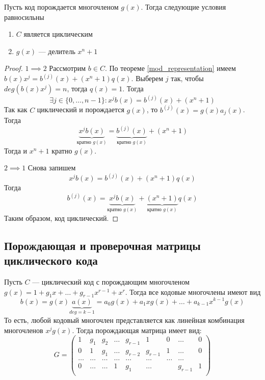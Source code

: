 \begin{theorem}
Пусть код порождается многочленом $g(x)$. Тогда следующие условия равносильны
\begin{enumerate}
\item $C$ является циклическим
\item $g(x)$ --- делитель $x^n + 1$
\end{enumerate}
\end{theorem}

\begin{proof}
$1 \implies 2$ Рассмотрим $b \in C$. По теореме \ref{mod_representation} имеем
$b(x) x^j = b^{(j)}(x) + (x^n + 1) q(x)$. Выберем $j$ так, чтобы $deg(b(x) x^j) = n$,
тогда $q(x) = 1$. Тогда 
$$\exists j \in \{0, \ldots, n-1\} \colon x^j b(x) = b^{(j)}(x) + (x^n + 1)$$
Так как $C$ циклический и порождается $g(x)$, то $b^{(j)}(x) = g(x) a_j(x)$.
Тогда 
$$\underbrace{x^j b(x)}_{\text{кратно }g(x)} = 
\underbrace{b^{(j)}(x)}_{\text{кратно } g(x)} + (x^n + 1)$$
Тогда и $x^n + 1$ кратно $g(x)$.

$2 \implies 1$ Снова запишем
$$x^j b(x) = b^{(j)}(x) + (x^n + 1) q(x)$$
Тогда
$$b^{(j)}(x) = \underbrace{x^j b(x)}_{\text{кратно }g(x)} 
             + \underbrace{(x^n+1)}_{\text{кратно } g(x)}q(x)$$
Таким образом, код циклический.
\end{proof}

\subsection{Порождающая и проверочная матрицы циклического кода}
Пусть $C$ --- циклический код с порождающим многочленом 
$g(x) = 1 + g_1 x + \ldots + g_{r-1} x^{r-1} + x^r$. Тогда все кодовые
многочлены имеют вид 
$$b(x) = g(x) \underbrace{a(x)}_{deg = k-1} = a_0 g(x) + a_1 x g(x) + \ldots + a_{k-1} x^{k-1} g(x)$$
То есть, любой кодовый многочлен представляется как линейная комбинация многочленов
$x^j g(x)$. Тогда порождающая матрица имеет вид:
$$G = \begin{pmatrix} 1 & g_1 & g_2 & \ldots & g_{r-1} & 1 & 0 & \ldots  & 0 \\
                  0 & 1 & g_1   & \ldots & g_{r-2} & g_{r-1} & 1 & \ldots & 0 \\
                  \ldots   & \ldots   &   \ldots & \ldots & \ldots &\ldots &\ldots & \ldots &  \\
                  0 & \ldots  &\ldots  & 1 & g_1 & \ldots           &   & g_{r-1} & 1 \\
  \end{pmatrix}$$  

